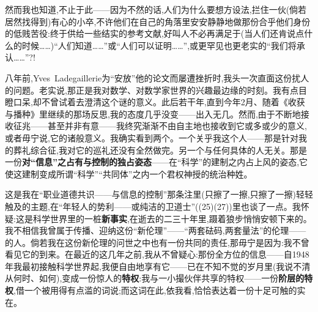 然而我也知道,不止于此——因为不然的话,人们为什么要想方设法,拦住一伙(倘若居然找得到)有心的小卒,不许他们在自己的角落里安安静静地做那份合乎他们身份的低贱苦役:终于供给一些结实的参考文献,好叫人不必再满足于(当人们还肯说点什么的时候……)“人们知道……”或“人们可以证明……”,或更罕见也更老实的“我们将承认……”?!

八年前,Yves~Ladegaillerie为“安放”他的论文而屡遭挫折时,我头一次直面这份扰人的问题。老实说,那正是我对数学、对数学家世界的兴趣最边缘的时刻。我有点目瞪口呆,却不曾试着去澄清这个谜的意义。此后若干年,直到今年2月、随着《收获与播种》里继续的那场反思,我的态度几乎没变——出入无几。然而,由于不断地接收征兆——甚至并非有意——我终究渐渐不由自主地也接收到它或多或少的意义,或者毋宁说,它的诸般意义。我确实看到两个。一个关乎我这个人——那是针对我的葬礼综合征,我对它的巡礼还没有全然做完。另一个与任何具体的人无关。那是一份\textbf{对“信息”之占有与控制的独占姿态}——在“科学”的建制之内占上风的姿态,它使这建制变成所谓“科学”“共同体”之内一个君权神授的统治种姓\dmark{}。

这是我在“职业道德共识——与信息的控制”那条注里(只擦了一擦,只擦了一擦)轻轻触及的主题,在“年轻人的势利——或纯洁的卫道士”((25)(27))里也谈了一点。我怀疑:这是科学世界里的一桩\textbf{新事实},在逝去的二三十年里,蹑着狼步悄悄安顿下来的。我不相信我曾属于传播、迎纳这份“新伦理”——“两套砝码,两套量法”的伦理——的人。倘若我在这份新伦理的问世之中也有一份共同的责任,那毋宁是因为:我不曾看见它的到来。在最近的这几年之前,我从不曾疑心:那份全方位的信息——自1948年我最初接触科学世界起,我便自由地享有它——已在不知不觉的岁月里(我说不清从何时、如何),变成一份惊人的\textbf{特权}:我与一小撮伙伴共享的特权——一份\textbf{阶层的特权},借一个被用得有点滥的词说;而这词在此,依我看,恰恰表达着一份十足可触的实在。

